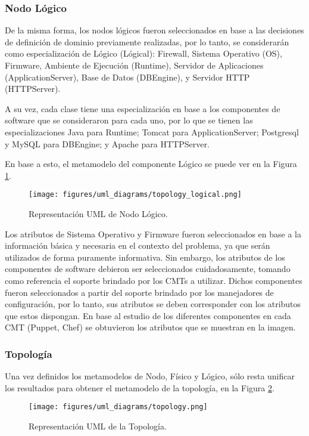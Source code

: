 \subsubsection{Nodo Lógico}
De la misma forma, los nodos lógicos fueron seleccionados en base a las decisiones de definición de dominio previamente realizadas, por lo tanto, se considerarán como especialización de Lógico (Lógical): Firewall, Sistema Operativo (OS), Firmware, Ambiente de Ejecución (Runtime), Servidor de Aplicaciones (ApplicationServer), Base de Datos (DBEngine), y Servidor HTTP (HTTPServer).

A su vez, cada clase tiene una especialización en base a los componentes de software que se consideraron para cada uno, por lo que se tienen las especializaciones Java para Runtime; Tomcat para ApplicationServer; Postgresql y MySQL para DBEngine; y Apache para HTTPServer. 

En base a esto, el metamodelo del componente Lógico se puede ver en la Figura \ref{fig:uml:logical}.

\begin{figure}[htbp]
    \centering
    \texttt{[image: figures/uml\_diagrams/topology\_logical.png]}
    \caption{Representación UML de Nodo Lógico.}
    \label{fig:uml:logical}
\end{figure}

Los atributos de Sistema Operativo y Firmware fueron seleccionados en base a la información básica y necesaria en el contexto del problema, ya que serán utilizados de forma puramente informativa. 
Sin embargo, los atributos de los componentes de software debieron ser seleccionados cuidadosamente, tomando como referencia el soporte brindado por los CMTs a utilizar. Dichos componentes fueron seleccionados a partir del soporte brindado por los manejadores de configuración, por lo tanto, sus atributos se deben corresponder con los atributos que estos dispongan. 
En base al estudio de los diferentes componentes en cada CMT (Puppet, Chef) se obtuvieron los atributos que se muestran en la imagen.

\subsubsection{Topología}
Una vez definidos los metamodelos de Nodo, Físico y Lógico, sólo resta unificar los resultados para obtener el metamodelo de la topología, en la Figura \ref{fig:uml:topology}.

\begin{figure}[htbp]
    \centering
    \texttt{[image: figures/uml\_diagrams/topology.png]}
    \caption{Representación UML de la Topología.}
    \label{fig:uml:topology}
\end{figure}


